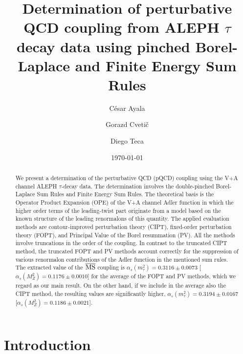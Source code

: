 \documentclass[aps,nofootinbib,showkeys,noshowpacs,preprintnumbers,amsmath,amssymb]{revtex4}
\begin{document}

\title{Determination of perturbative QCD coupling from ALEPH $\tau$ decay data using pinched Borel-Laplace and Finite Energy Sum Rules}

\author{C\'esar Ayala}
\author{Gorazd Cveti\v{c}}
\author{Diego Teca}



\date{\today}


\begin{abstract}
  We present a determination of the perturbative QCD (pQCD) coupling using the V+A channel ALEPH $\tau$-decay data. The determination involves the double-pinched Borel-Laplace Sum Rules and Finite Energy Sum Rules. The theoretical basis is the Operator Product Expansion (OPE) of the V+A channel Adler function in which the higher order terms of the leading-twist part originate from a model based on the known structure of the leading renormalons of this quantity. The applied evaluation methods are contour-improved perturbation theory (CIPT), fixed-order perturbation theory (FOPT), and Principal Value of the Borel resummation (PV). All the methods involve truncations in the order of the coupling. In contrast to the truncated CIPT method, the truncated FOPT and PV methods account correctly for the suppression of various renormalon contributions of the Adler function in the mentioned sum rules. The extracted value of the ${\overline {\rm MS}}$ coupling is $\alpha_s(m_{\tau}^2) = 0.3116 \pm 0.0073$ [$\alpha_s(M_Z^2)=0.1176 \pm 0.0010$] for the average of the FOPT and PV methods, which we regard as our main result. On the other hand, if we include in the average also the CIPT method, the resulting values are significantly higher, $\alpha_s(m_{\tau}^2) = 0.3194 \pm 0.0167$ [$\alpha_s(M_Z^2)=0.1186 \pm 0.0021$].

\end{abstract}


\maketitle


\section{Introduction}
\label{sec:Int}
\end{document}
